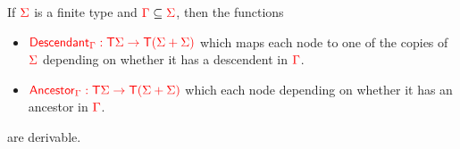 \medskip
\noindent\begin{example} If $\rSigma$ is a finite type and $\rGamma\subseteq \rSigma$, then the functions 
\begin{itemize}
\item $\ranked{\mathsf{Descendant}_\rGamma: \tmonad \rSigma \to \tmonad (\rSigma+\rSigma)}$ which maps each node to one of the copies of $\rSigma$ depending on whether it has a descendent in $\rGamma$.
\item $\ranked{\mathsf{Ancestor}_\rGamma: \tmonad \rSigma \to \tmonad (\rSigma+\rSigma)}$ which 
 each node depending on whether it has an ancestor in $\rGamma$.
\end{itemize}
are derivable.
\end{example}

